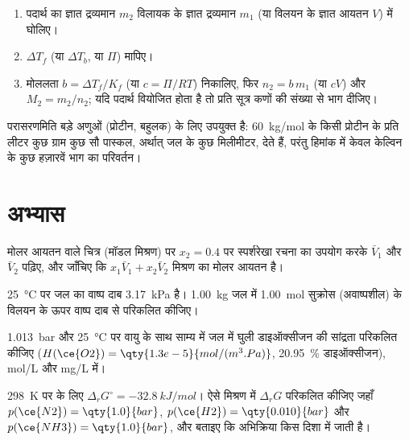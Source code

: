 \begin{method}[अणुसंख्य गुणधर्म द्वारा मोलर द्रव्यमान]\label{met:b2:chemical-potential:molar-mass}
\begin{enumerate}
  \item पदार्थ का ज्ञात द्रव्यमान $m_2$ विलायक के ज्ञात द्रव्यमान $m_1$
        (या विलयन के ज्ञात आयतन $V$) में घोलिए।
  \item $\Delta T_f$ (या $\Delta T_b$, या $\Pi$) मापिए।
  \item मोललता $b = \Delta T_f/K_f$ (या $c = \Pi/RT$) निकालिए, फिर $n_2 =
        b\,m_1$ (या $cV$) और $M_2 = m_2/n_2$; यदि पदार्थ वियोजित होता है तो प्रति
        सूत्र कणों की संख्या से भाग दीजिए।
\end{enumerate}
परासरणमिति बड़े अणुओं (प्रोटीन, बहुलक) के लिए उपयुक्त है: \qty{60}{kg/mol} के
किसी प्रोटीन के प्रति लीटर कुछ ग्राम कुछ सौ पास्कल, अर्थात् जल के कुछ मिलीमीटर,
देते हैं, परंतु हिमांक में केवल केल्विन के कुछ हज़ारवें भाग का परिवर्तन।
\end{method}

\section{अभ्यास}

\begin{exercise}[$\star$]\label{exo:b2:chemical-potential:1}
मोलर आयतन वाले चित्र (मॉडल मिश्रण) पर $x_2 = 0.4$ पर स्पर्शरेखा रचना
का उपयोग करके $\bar V_1$ और $\bar V_2$ पढ़िए, और जाँचिए कि
$x_1\bar V_1 + x_2\bar V_2$ मिश्रण का मोलर आयतन है।
\end{exercise}

\begin{exercise}[$\star$]\label{exo:b2:chemical-potential:2}
\qty{25}{\celsius} पर जल का वाष्प दाब \qty{3.17}{kPa} है।
\qty{1.00}{kg} जल में \qty{1.00}{mol} सुक्रोस (अवाष्पशील) के विलयन के ऊपर
वाष्प दाब  से परिकलित कीजिए।
\end{exercise}

\begin{exercise}[$\star$]\label{exo:b2:chemical-potential:3}
\qty{1.013}{bar} और \qty{25}{\celsius} पर वायु के साथ साम्य में जल में घुली
डाइऑक्सीजन की सांद्रता परिकलित कीजिए ($H(\ce{O2}) =
\qty{1.3e-5}{mol/(m^3.Pa)}$, \qty{20.95}{\percent} डाइऑक्सीजन),
\unit{mol/L} और \unit{mg/L} में।
\end{exercise}

\begin{exercise}[$\star$]\label{exo:b2:chemical-potential:4}
\qty{298}{K} पर  के लिए $\Delta_r G^\circ =
\qty{-32.8}{kJ/mol}$। ऐसे मिश्रण में $\Delta_r G$ परिकलित कीजिए जहाँ
$p(\ce{N2}) = \qty{1.0}{bar}$, $p(\ce{H2}) = \qty{0.010}{bar}$ और
$p(\ce{NH3}) = \qty{1.0}{bar}$, और बताइए कि अभिक्रिया किस दिशा में जाती है।
\end{exercise}

